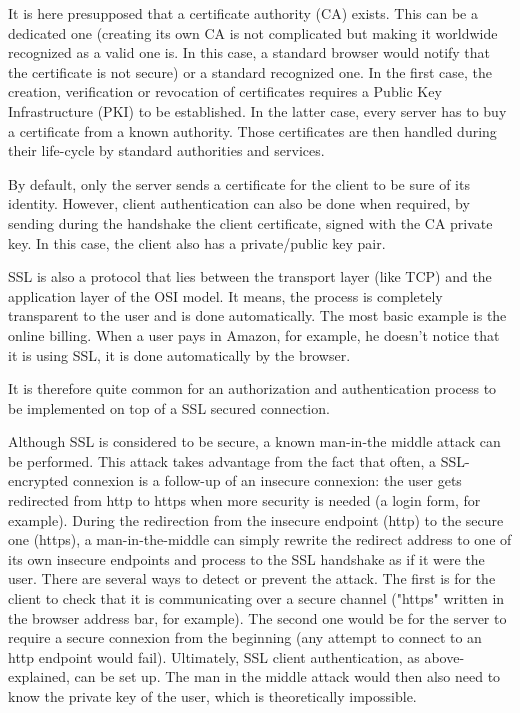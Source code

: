 It is here presupposed that a certificate authority (CA) exists. This can be a dedicated one (creating its own CA is not complicated but making it worldwide recognized as a valid one is. In this case, a standard browser would notify that the certificate is not secure) or a standard recognized one. In the first case, the creation, verification or revocation of certificates requires a Public Key Infrastructure (PKI) to be established. In the latter case, every server has to buy a certificate from a known authority. Those certificates are then handled during their life-cycle by standard authorities and services.


By default, only the server sends a certificate for the client to be sure of its identity. However, client authentication can also be done when required, by sending during the handshake the client certificate, signed with the CA private key. In this case, the client also has a private/public key pair.
 
SSL is also a protocol that lies between the transport layer (like TCP) and the application layer of the OSI model. It means, the process is completely transparent to the user and is done automatically. The most basic example is the online billing. When a user pays in Amazon, for example, he doesn't notice that it is using SSL, it is done automatically by the browser.

It is therefore quite common for an authorization and authentication process to be implemented on top of a SSL secured connection.

Although SSL is considered to be secure, a known man-in-the middle attack can be performed. This attack takes advantage from the fact that often, a SSL-encrypted connexion is a follow-up of an insecure connexion: the user gets redirected from http to https when more security is needed (a login form, for example). During the redirection from the insecure endpoint (http) to the secure one (https), a man-in-the-middle can simply rewrite the redirect address to one of its own insecure endpoints and process to the SSL handshake as if it were the user. There are several ways to detect or prevent the attack. The first is for the client to check that it is communicating over a secure channel ("https" written in the browser address bar, for example). The second one would be for the server to require a secure connexion from the beginning (any attempt to connect to an http endpoint would fail). Ultimately, SSL client authentication, as above-explained, can be set up. The man in the middle attack would then also need to know the private key of the user, which is theoretically impossible.

